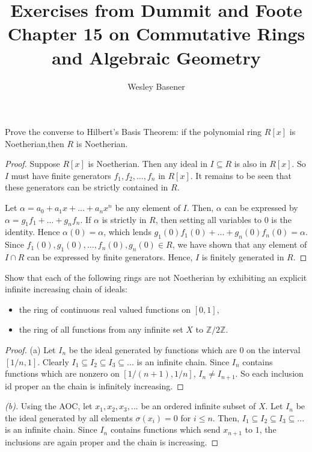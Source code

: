 \documentclass[10pt]{article}
\newcommand{\Z}{\mathbb{Z}}
\newenvironment{problem}[2][Problem]{\begin{trivlist}
		\item[\hskip \labelsep {\bfseries #1}\hskip \labelsep {\bfseries #2.}]}{\end{trivlist}}
\begin{document}
	
	\title{Exercises from Dummit and Foote Chapter 15 on Commutative Rings and Algebraic Geometry}
	\author{Wesley Basener}
	\maketitle
	
	\begin{problem}{1.1}
		Prove the converse to Hilbert's Basis Theorem: if the polynomial ring $R[x]$ is Noetherian,then $R$ is Noetherian.
		\begin{proof}
			Suppose $R[x]$ is Noetherian. Then any ideal in $I \subseteq R$ is also in $R[x]$. So $I$ must have finite generators $f_1, f_2, ..., f_n$ in $R[x]$. It remains to be seen that these generators can be strictly contained in $R$.
			
			Let $\alpha = a_0 +a_1x + ... + a_nx^n$ be any element of $I$. Then, $\alpha$ can be expressed by $\alpha = g_1f_1 + ... + g_nf_n$. If $\alpha$ is strictly in $R$, then setting all variables to $0$ is the identity. Hence $\alpha(0) = \alpha$, which lends $g_1(0)f_1(0) + ... + g_n(0)f_n(0) = \alpha$. Since $f_1(0), g_1(0), ..., f_n(0), g_n(0) \in R$, we have shown that any element of $I \cap R$ can be expressed by finite generators. Hence, $I$ is finitely generated in $R$. 
		\end{proof}
	\end{problem}
	
	\begin{problem}{1.2}
		Show that each of the following rings are not Noetherian by exhibiting an explicit infinite increasing chain of ideals:
		\begin{itemize}
			\item[\textbf{(a)}] the ring of continuous real valued functions on $[0, 1]$,
			\item[\textbf{(b)}] the ring of all functions from any infinite set $X$ to $\Z/2\Z$.
		\end{itemize}
		 \begin{proof}{(a)}
		 	Let $I_n$ be the ideal generated by functions which are $0$ on the interval $[1/n, 1]$. Clearly $I_1 \subseteq I_2 \subseteq I_3 \subseteq ...$ is an infinite chain. Since $I_n$ contains functions which are nonzero on $[1/(n+1),1/n]$, $I_n \not = I_{n+1}$. So each inclusion id proper an the chain is infinitely increasing.
		 \end{proof}
		 \begin{proof}[(b)]
		 	Using the AOC, let $x_1, x_2, x_3, ...$ be an ordered infinite subset of $X$. Let $I_n$ be the ideal generated by all elements $\sigma(x_i) = 0$ for $i \leq n$. Then, $I_1 \subseteq I_2 \subseteq I_3 \subseteq ...$ is an infinite chain. Since $I_n$ contains functions which send $x_{n+1}$ to $1$, the inclusions are again proper and the chain is increasing.
		 \end{proof}
	\end{problem}
	
\end{document}
